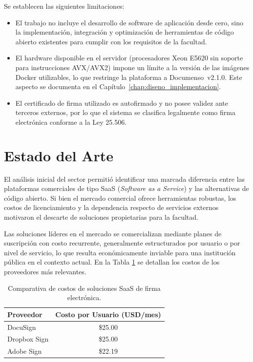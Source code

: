 Se establecen las siguientes limitaciones:

\begin{itemize}
    \item El trabajo no incluye el desarrollo de software de aplicación desde cero, sino la implementación, integración y optimización de herramientas de código abierto existentes para cumplir con los requisitos de la facultad.
    \item El hardware disponible en el servidor (procesadores Xeon E5620 sin soporte para instrucciones AVX/AVX2) impone un límite a la versión de las imágenes Docker utilizables, lo que restringe la plataforma a Documenso~v2.1.0. Este aspecto se documenta en el Capítulo~\ref{chap:diseno_implementacion}.
    \item El certificado de firma utilizado es autofirmado y no posee validez ante terceros externos, por lo que el sistema se clasifica legalmente como firma electrónica conforme a la Ley 25.506.
\end{itemize}

\section{Estado del Arte}
\label{sec:estado_arte}

El análisis inicial del sector permitió identificar una marcada diferencia entre las plataformas comerciales de tipo SaaS (\textit{Software as a Service}) y las alternativas de código abierto. Si bien el mercado comercial ofrece herramientas robustas, los costos de licenciamiento y la dependencia respecto de servicios externos motivaron el descarte de soluciones propietarias para la facultad.

Las soluciones líderes en el mercado se comercializan mediante planes de suscripción con costo recurrente, generalmente estructurados por usuario o por nivel de servicio, lo que resulta económicamente inviable para una institución pública en el contexto actual. En la Tabla \ref{tab:comparativa_saas} se detallan los costos de los proveedores más relevantes.

\begin{table}[H]
    \centering
    \begin{tabular}{l c}
        \toprule
        Proveedor & Costo por Usuario (USD/mes) \\
        \midrule
        DocuSign \cite{docusign_pricing} & \$25.00 \\
        Dropbox Sign \cite{dropbox_sign_pricing} & \$25.00 \\
        Adobe Sign \cite{adobe_sign_pricing} & \$22.19 \\
        \bottomrule
    \end{tabular}
    \caption[Comparativa de costos de soluciones SaaS]{Comparativa de costos de soluciones SaaS de firma electrónica.}
    \label{tab:comparativa_saas}
\end{table}

